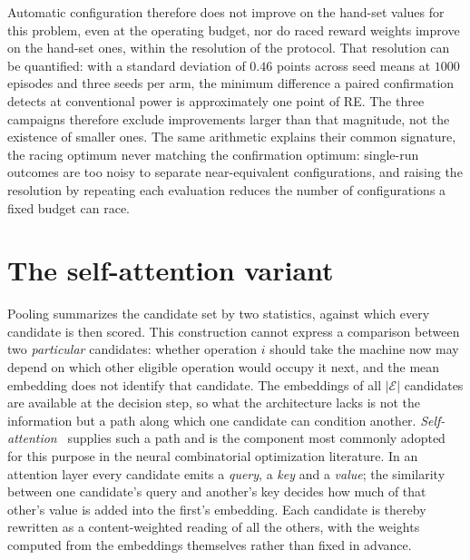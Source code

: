 \documentclass[preprint,12pt]{elsarticle}
\begin{document}
Automatic configuration therefore does not improve on the hand-set
values for this problem, even at the operating budget, nor do raced
reward weights improve on the hand-set ones, within the resolution of
the protocol. That resolution can be quantified: with a standard
deviation of $0.46$ points across seed means at $1000$ episodes and
three seeds per arm, the minimum difference a paired confirmation
detects at conventional power is approximately one point of RE. The
three campaigns therefore exclude improvements larger than that
magnitude, not the existence of smaller ones. The same arithmetic
explains their common signature, the racing optimum never matching
the confirmation optimum: single-run outcomes are too noisy to
separate near-equivalent configurations, and raising the resolution
by repeating each evaluation reduces the number of configurations a
fixed budget can race.

\section{The self-attention variant}
\label{sup:attention}

Pooling summarizes the candidate set by two statistics, against which
every candidate is then scored. This construction cannot express a
comparison between two \emph{particular} candidates: whether
operation $i$ should take the machine now may depend on which other
eligible operation would occupy it next, and the mean embedding does
not identify that candidate. The embeddings of all
$|\mathcal{E}|$ candidates are available at the decision step, so
what the architecture lacks is not the information but a path along
which one candidate can condition another.
\emph{Self-attention}~\citep{Vaswani2017} supplies such a path and
is the component most commonly adopted for this purpose in the
neural combinatorial optimization literature. In an attention layer
every candidate emits a \emph{query}, a \emph{key} and a
\emph{value}; the similarity between one candidate's query and
another's key decides how much of that other's value is added into
the first's embedding. Each candidate is thereby rewritten as a
content-weighted reading of all the others, with the weights computed
from the embeddings themselves rather than fixed in advance.
\end{document}
